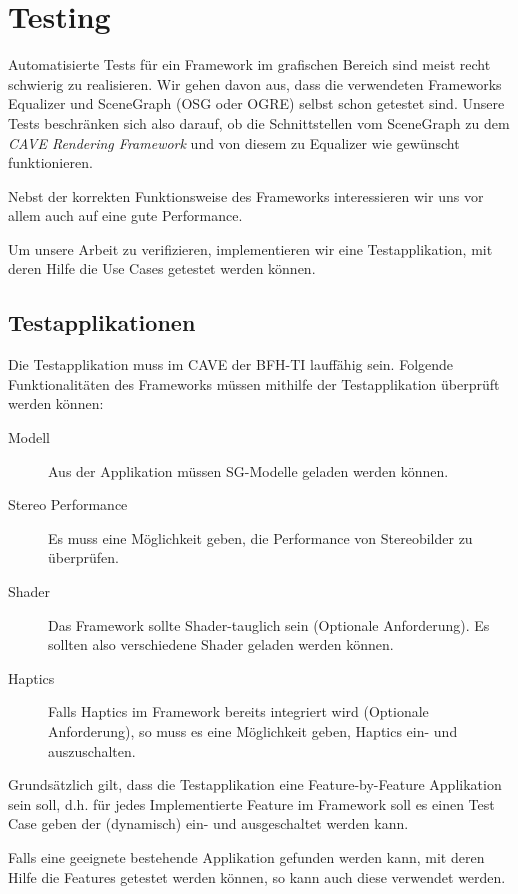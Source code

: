 \chapter{Testing}

Automatisierte Tests f\"ur ein Framework im grafischen Bereich sind meist recht schwierig zu realisieren. Wir gehen davon aus, dass die verwendeten Frameworks Equalizer und SceneGraph (OSG oder OGRE) selbst schon getestet sind. Unsere Tests beschr\"anken sich also darauf, ob die Schnittstellen vom SceneGraph zu dem \textit{CAVE Rendering Framework} und von diesem zu Equalizer wie gew\"unscht funktionieren.

Nebst der korrekten Funktionsweise des Frameworks interessieren wir uns vor allem auch auf eine gute Performance. 

Um unsere Arbeit zu verifizieren, implementieren wir eine Testapplikation, mit deren Hilfe die Use Cases getestet werden k\"onnen.

\section{Testapplikationen}

Die Testapplikation muss im CAVE der BFH-TI lauff\"ahig sein. Folgende Funktionalit\"aten des Frameworks m\"ussen mithilfe der Testapplikation \"uberpr\"uft werden k\"onnen:

\begin{description}
\item[Modell] Aus der Applikation m\"ussen SG-Modelle geladen werden k\"onnen.
\item[Stereo Performance] Es muss eine M\"oglichkeit geben, die Performance von Stereobilder zu \"uberpr\"ufen.
\item[Shader] Das Framework sollte Shader-tauglich sein (Optionale Anforderung). Es sollten also verschiedene Shader geladen werden k\"onnen.
\item[Haptics] Falls Haptics im Framework bereits integriert wird (Optionale Anforderung), so muss es eine M\"oglichkeit geben, Haptics ein- und auszuschalten.
\end{description}

Grunds\"atzlich gilt, dass die Testapplikation eine Feature-by-Feature Applikation sein soll, d.h. f\"ur jedes Implementierte Feature im Framework soll es einen Test Case geben der (dynamisch) ein- und ausgeschaltet werden kann.

Falls eine geeignete bestehende Applikation gefunden werden kann, mit deren Hilfe die Features getestet werden k\"onnen, so kann auch diese verwendet werden.

